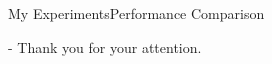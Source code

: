 \begin{frame}{My Experiments}{Performance Comparison}
    \begin{center}
        \begin{table}
            \centering
            
            \caption{Results on the MVTec dataset for different blending methods.}
        \end{table}
    \end{center}
\end{frame}


\begin{frame}[t,titleimage]{-}
    Thank you for your attention.
\end{frame}